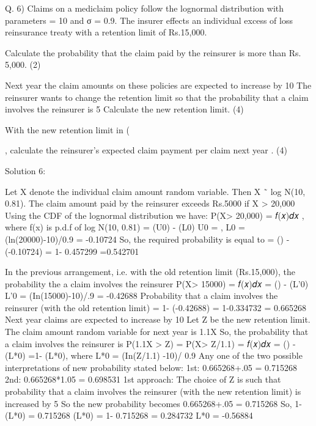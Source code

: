 

Q. 6)
Claims on a mediclaim policy follow the lognormal distribution with parameters \mu  = 10 and σ = 0.9. 
The insurer effects an individual excess of loss reinsurance treaty with a retention limit of Rs.15,000.
\item Calculate the probability that the claim paid by the reinsurer is more than Rs. 5,000.
(2)
\item Next year the claim amounts on these policies are expected to increase by 10%
The reinsurer wants to change the retention limit so that the probability that a claim involves the reinsurer is 5%
Calculate the new retention limit.
(4)
\item With the new retention limit in (\item, calculate the reinsurer’s expected claim payment per claim next year .
(4)




Solution 6:
\item
Let X denote the individual claim amount random variable. Then X ˜ log N(10, 0.81).
The claim amount paid by the reinsurer exceeds Rs.5000 if X > 20,000
Using the CDF of the lognormal distribution we have:
P(X> 20,000) = \int 𝑓(𝑥)𝑑𝑥 , where f(x) is p.d.f of log N(10, 0.81)
= \Phi(U0) - \Phi(L0)
U0 = \infty, L0 = (ln(20000)-10)/0.9 = -0.10724
So, the required probability is equal to
= \Phi(\infty) - \Phi(-0.10724) = 1- 0.457299 =0.542701

\item
In the previous arrangement, i.e. with the old retention limit (Rs.15,000), the probability the a claim involves the reinsurer
P(X> 15000) = \int 𝑓(𝑥)𝑑𝑥 = \Phi(\infty) - \Phi(L’0)
L’0 = (In(15000)-10)/.9 = -0.42688
Probability that a claim involves the reinsurer (with the old retention limit)
= 1- \Phi(-0.42688)
= 1-0.334732 = 0.665268
Next year claims are expected to increase by 10%
Let Z be the new retention limit. The claim amount random variable for next year is 1.1X
So, the probability that a claim involves the reinsurer is
P(1.1X > Z) = P(X> Z/1.1) = \int 𝑓(𝑥)𝑑𝑥
= \Phi(\infty) - \Phi(L*0) =1- \Phi(L*0),
where L*0 = (In(Z/1.1) -10)/ 0.9
Any one of the two possible interpretations of new probability stated below:
1st: 0.665268+.05 = 0.715268
2nd: 0.665268*1.05 = 0.698531
1st approach:
The choice of Z is such that probability that a claim involves the reinsurer (with the new retention limit) is increased by 5%
So the new probability becomes 0.665268+.05 = 0.715268
So, 1- \Phi(L*0) = 0.715268
\Phi(L*0) = 1- 0.715268 = 0.284732
L*0 = -0.56884


